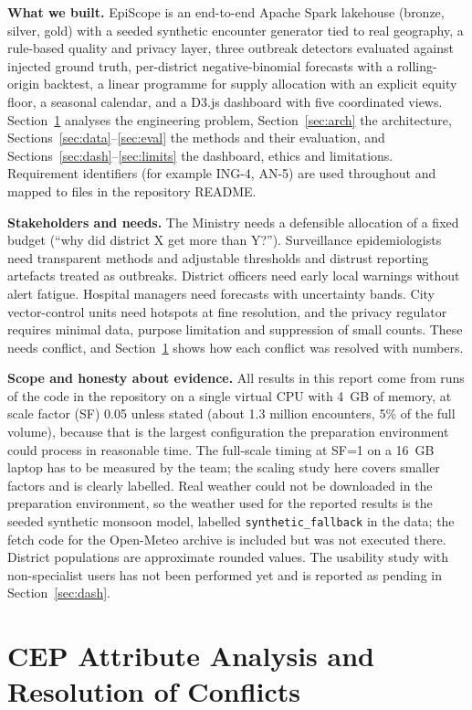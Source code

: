 \documentclass[conference]{IEEEtran}
\begin{document}
\textbf{What we built.} EpiScope is an end-to-end Apache Spark lakehouse (bronze, silver, gold) with a seeded synthetic encounter generator tied to real geography, a rule-based quality and privacy layer, three outbreak detectors evaluated against injected ground truth, per-district negative-binomial forecasts with a rolling-origin backtest, a linear programme for supply allocation with an explicit equity floor, a seasonal calendar, and a D3.js dashboard with five coordinated views. Section~\ref{sec:cep} analyses the engineering problem, Section~\ref{sec:arch} the architecture, Sections~\ref{sec:data}--\ref{sec:eval} the methods and their evaluation, and Sections~\ref{sec:dash}--\ref{sec:limits} the dashboard, ethics and limitations. Requirement identifiers (for example ING-4, AN-5) are used throughout and mapped to files in the repository README.

\textbf{Stakeholders and needs.} The Ministry needs a defensible allocation of a fixed budget (``why did district X get more than Y?''). Surveillance epidemiologists need transparent methods and adjustable thresholds and distrust reporting artefacts treated as outbreaks. District officers need early local warnings without alert fatigue. Hospital managers need forecasts with uncertainty bands. City vector-control units need hotspots at fine resolution, and the privacy regulator requires minimal data, purpose limitation and suppression of small counts. These needs conflict, and Section~\ref{sec:cep} shows how each conflict was resolved with numbers.

\textbf{Scope and honesty about evidence.} All results in this report come from runs of the code in the repository on a single virtual CPU with 4~GB of memory, at scale factor (SF) 0.05 unless stated (about 1.3 million encounters, 5\% of the full volume), because that is the largest configuration the preparation environment could process in reasonable time. The full-scale timing at SF=1 on a 16~GB laptop has to be measured by the team; the scaling study here covers smaller factors and is clearly labelled. Real weather could not be downloaded in the preparation environment, so the weather used for the reported results is the seeded synthetic monsoon model, labelled \texttt{synthetic\_fallback} in the data; the fetch code for the Open-Meteo archive is included but was not executed there. District populations are approximate rounded values. The usability study with non-specialist users has not been performed yet and is reported as pending in Section~\ref{sec:dash}.
\section{CEP Attribute Analysis and Resolution of Conflicts}\label{sec:cep}
\end{document}
